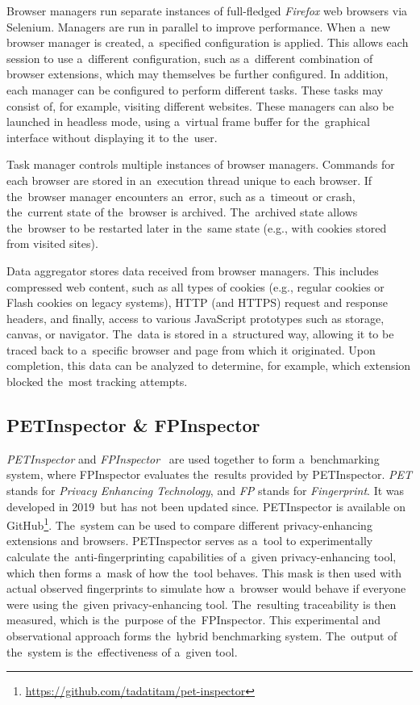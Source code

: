 Browser managers run separate instances of full-fledged \textit{Firefox} web browsers via Selenium. Managers are run in parallel to improve performance. When a~new browser manager is created, a~specified configuration is applied. This allows each session to use a~different configuration, such as a~different combination of browser extensions, which may themselves be further configured. In addition, each manager can be configured to perform different tasks. These tasks may consist of, for example, visiting different websites. These managers can also be launched in headless mode, using a~virtual frame buffer for the~graphical interface without displaying it to the~user.

Task manager controls multiple instances of browser managers. Commands for each browser are stored in an~execution thread unique to each browser. If the~browser manager encounters an~error, such as a~timeout or crash, the~current state of the~browser is archived. The~archived state allows the~browser to be restarted later in the~same state (e.g., with cookies stored from visited sites).

Data aggregator stores data received from browser managers. This includes compressed web content, such as all types of cookies (e.g., regular cookies or Flash cookies on legacy systems), HTTP (and HTTPS) request and response headers, and finally, access to various JavaScript prototypes such as storage, canvas, or navigator. The~data is stored in a~structured way, allowing it to be traced back to a~specific browser and page from which it originated. Upon completion, this data can be analyzed to determine, for example, which extension blocked the~most tracking attempts.

\subsection{PETInspector \& FPInspector}
\label{petins-section}
\textit{PETInspector} and \textit{FPInspector}~\cite{petinspector} are used together to form a~benchmarking system, where FPInspector evaluates the~results provided by PETInspector. \textit{PET} stands for \textit{Privacy Enhancing Technology}, and \textit{FP} stands for \textit{Fingerprint}. It was developed in 2019~but has not been updated since. PETInspector is available on GitHub\footnote{\url{https://github.com/tadatitam/pet-inspector}}. The~system can be used to compare different privacy-enhancing extensions and browsers. PETInspector serves as a~tool to experimentally calculate the~anti-fingerprinting capabilities of a~given privacy-enhancing tool, which then forms a~mask of how the~tool behaves. This mask is then used with actual observed fingerprints to simulate how a~browser would behave if everyone were using the~given privacy-enhancing tool. The~resulting traceability is then measured, which is the~purpose of the~FPInspector. This experimental and observational approach forms the~hybrid benchmarking system. The~output of the~system is the~effectiveness of a~given tool. 

